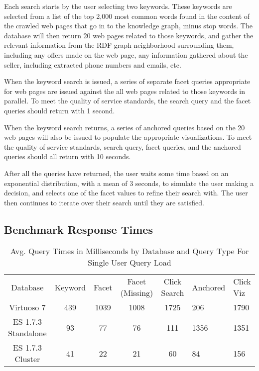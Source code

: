 Each search starts by the user selecting two keywords.  
These keywords are selected from a list of the top 2,000 most common words found in the content of the crawled web pages that go in to the knowledge graph, minus stop words. 
The database will then return 20 web pages related to those keywords, and gather the relevant information from the RDF graph neighborhood surrounding them, including any offers made on the web page, any information gathered about the seller, including extracted phone numbers and emails, etc.  

When the keyword search is issued, a series of separate facet queries appropriate for web pages are issued against the all web pages related to those keywords in parallel.
To meet the quality of service standards, the search query and the facet queries should return with 1 second.

When the keyword search returns, a series of anchored queries based on the 20 web pages will also be issued to populate the appropriate visualizations. 
To meet the quality of service standards, search query, facet queries, and the anchored queries should all return with 10 seconds.  

After all the queries have returned, the user waits some time based on an exponential distribution, with a mean of 3 seconds, to simulate the user making a decision, and selects one of the facet values to refine their search with.
The user then continues to iterate over their search until they are satisfied.  




\subsection{Benchmark Response Times}

 \begin{table} 
    \begin{tabular}{ c c c c c }
        Database & Keyword & Facet & Facet (Missing) & Click Search & Anchored & Click Viz \\ 
        Virtuoso 7 & 439 & 1039 & 1008 & 1725 & 206 &  1790 \\ 
        ES 1.7.3 Standalone & 93 & 77 & 76 & 111 & 1356 & 1351 \\ 
        ES 1.7.3 Cluster & 41 & 22 & 21 & 60 & 84 & 156 \\ 
    \end{tabular} 
    \caption{Avg. Query Times in Milliseconds by Database and Query Type For Single User Query Load}
    \label{table:qt_single_user}
\end{table}

